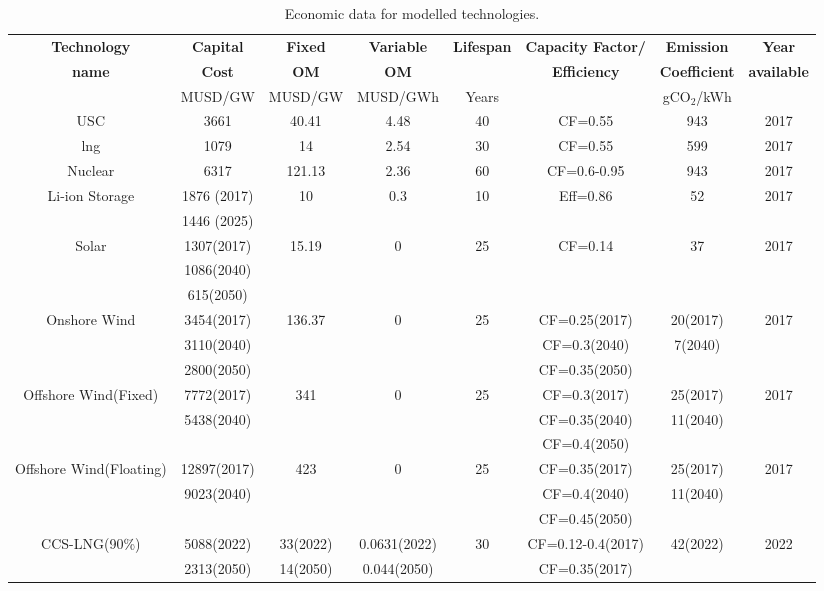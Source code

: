 \begin{landscape}
\begin{longtable}{ |*{8}{c|} }
\caption{Economic data for modelled technologies.}\\
\hline
\textbf{Technology} & \textbf{Capital} & \textbf{Fixed} & \textbf{Variable} & \textbf{Lifespan} & \textbf{Capacity Factor/} & \textbf{Emission} & \textbf{Year} \\
\textbf{name} & \textbf{Cost} & \textbf{\gls{OM}} & \textbf{\gls{OM}} &  & \textbf{Efficiency} & \textbf{Coefficient} & \textbf{available} \\
 & MUSD/GW & MUSD/GW & MUSD/GWh & Years  &  & gCO$_2$/kWh  &  \\
\hline
\endhead  %
\hline
\endfoot  %
\hline
\endlastfoot
\gls{USC} & 3661 & 40.41 & 4.48 & 40 & CF=0.55 & 943 & 2017 \\
\gls{lng} & 1079 & 14 & 2.54 & 30 & CF=0.55 & 599 & 2017 \\
Nuclear & 6317 & 121.13 & 2.36 & 60 & CF=0.6-0.95 & 943 & 2017 \\
Li-ion Storage & 1876 (2017) & 10 & 0.3 & 10 & Eff=0.86 & 52 & 2017 \\
 & 1446 (2025) &  &  &  &  & &  \\
Solar & 1307(2017) & 15.19 & 0  & 25 & CF=0.14 & 37 & 2017 \\
 & 1086(2040) & & & & &  & \\
 & 615(2050) & & & & & &  \\
Onshore Wind & 3454(2017) & 136.37 & 0 & 25 & CF=0.25(2017) & 20(2017) & 2017 \\
 & 3110(2040) &  &  &  & CF=0.3(2040) & 7(2040) &  \\
 & 2800(2050) &  &  &  & CF=0.35(2050) &  &  \\
Offshore Wind(Fixed) & 7772(2017) & 341 & 0 & 25 & CF=0.3(2017) & 25(2017) & 2017 \\
 & 5438(2040) &  &  & & CF=0.35(2040) & 11(2040) &  \\
 &  &  &  & & CF=0.4(2050) &  &  \\
Offshore Wind(Floating) & 12897(2017) & 423 & 0 & 25 & CF=0.35(2017) & 25(2017) & 2017 \\
 & 9023(2040) &  &  &  & CF=0.4(2040) & 11(2040)  &  \\
 &  &  &  &  & CF=0.45(2050) &  &  \\
CCS-LNG(90\%) & 5088(2022) & 33(2022) & 0.0631(2022) & 30 & CF=0.12-0.4(2017) & 42(2022) & 2022 \\
 & 2313(2050) & 14(2050) & 0.044(2050) &  & CF=0.35(2017) &  & \\

\end{longtable}
\end{landscape}
